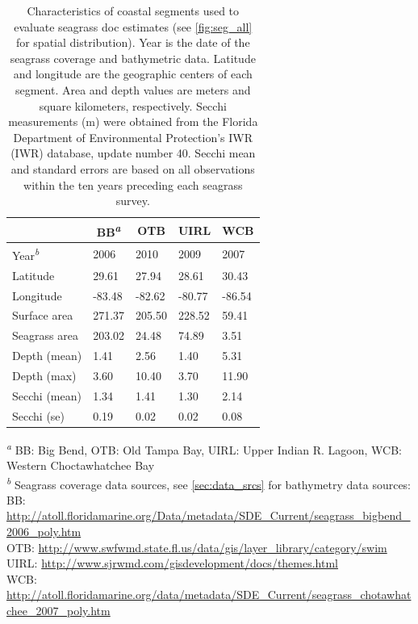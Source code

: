 \documentclass[letterpaper,12pt,oneside]{article}\usepackage[]{graphicx}\usepackage[]{color}
\begin{document}
\begin{table}[!tbp]
\caption{Characteristics of coastal segments used to evaluate seagrass \acl{doc} estimates (see \cref{fig:seg_all} for spatial distribution).  Year is the date of the seagrass coverage and bathymetric data.  Latitude and longitude are the geographic centers of each segment.  Area and depth values are meters and square kilometers, respectively.  Secchi measurements (m) were obtained from the Florida Department of Environmental Protection's \acl{IWR} (\acs{IWR}) database, update number 40.  Secchi mean and standard errors are based on all observations within the ten years preceding each seagrass survey.\label{tab:seg_summ}} 
\begin{center}
\begin{tabular}{lllll}
\hline\hline
\multicolumn{1}{l}{}&\multicolumn{1}{c}{BB\textsuperscript{\textit{a}}}&\multicolumn{1}{c}{OTB}&\multicolumn{1}{c}{UIRL}&\multicolumn{1}{c}{WCB}\tabularnewline
\hline
Year\textsuperscript{\textit{b}}&2006&2010&2009&2007\tabularnewline
Latitude& 29.61& 27.94& 28.61& 30.43\tabularnewline
Longitude&-83.48&-82.62&-80.77&-86.54\tabularnewline
Surface area&271.37&205.50&228.52& 59.41\tabularnewline
Seagrass area&203.02& 24.48& 74.89&  3.51\tabularnewline
Depth (mean)&  1.41&  2.56&  1.40&  5.31\tabularnewline
Depth (max)&  3.60& 10.40&  3.70& 11.90\tabularnewline
Secchi (mean)&  1.34&  1.41&  1.30&  2.14\tabularnewline
Secchi (se)&  0.19&  0.02&  0.02&  0.08\tabularnewline
\hline
\end{tabular}\end{center}

\footnotesize \textsuperscript{\textit{a}} BB: Big Bend, OTB: Old Tampa Bay, UIRL: Upper Indian R. Lagoon, WCB: Western Choctawhatchee Bay\\\textsuperscript{\textit{b}} Seagrass coverage data sources, see \cref{sec:data_srcs} for bathymetry data sources:\scriptsize\\BB: \url{http://atoll.floridamarine.org/Data/metadata/SDE_Current/seagrass_bigbend_2006_poly.htm}\\OTB: \url{http://www.swfwmd.state.fl.us/data/gis/layer_library/category/swim}\\UIRL: \url{http://www.sjrwmd.com/gisdevelopment/docs/themes.html}\\WCB: \url{http://atoll.floridamarine.org/data/metadata/SDE_Current/seagrass_chotawhatchee_2007_poly.htm}\end{table}
\end{document}
